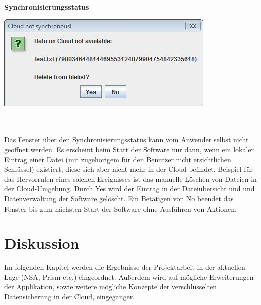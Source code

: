 \documentclass[12pt,a4paper,bibliography=totocnumbered,listof=totocnumbered]{scrartcl}
\begin{document}
\textbf{Synchronisierungsstatus}
\vspace{1em}
$\;$\\
\begin{minipage}{\linewidth}
	\centering
	\includegraphics[width=0.4\linewidth]{Synchron.jpg}
	\label{Synchron}
\end{minipage}
\\\\Das Fenster über den Synchronisierungsstatus kann vom Anwender selbst nicht geöffnet werden. Es erscheint beim Start der Software nur dann, wenn ein lokaler Eintrag einer Datei (mit zugehörigem für den Benutzer nicht ersichtlichen Schlüssel) existiert, diese sich aber nicht mehr in der Cloud befindet. Beispiel für das Hervorrufen eines solchen Ereignisses ist das manuelle Löschen von Dateien in der Cloud-Umgebung. Durch Yes wird der Eintrag in der Dateiübersicht und und Datenverwaltung der Software gelöscht. Ein Betätigen von No beendet das Fenster bis zum nächsten Start der Software ohne Ausführen von Aktionen.
\pagebreak

\section{Diskussion}
Im folgenden Kapitel werden die Ergebnisse der Projektarbeit in der aktuellen Lage (NSA, Prism etc.) eingeordnet. Außerdem wird auf mögliche Erweiterungen der Applikation, sowie weitere mögliche Konzepte der verschlüsselten Datensicherung in der Cloud, eingegangen. 
\end{document}
